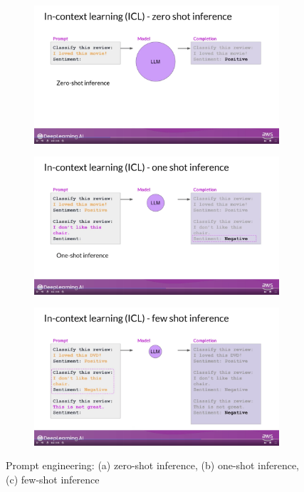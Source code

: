 \documentclass[12pt]{report}
\begin{document}
\begin{figure}
  \centering
  \begin{subfigure}[] %
    \centering
    \includegraphics[trim=3cm 7cm 5cm 0cm,clip,scale=0.1]{pics/zeroshot.png}
  \end{subfigure}%
  \begin{subfigure}[] %
    \centering
    \includegraphics[trim=3cm 7cm 5cm 0cm,clip,scale=0.1]{pics/oneshot.png}
  \end{subfigure}
  \begin{subfigure}[] %
  \centering
  \includegraphics[trim=3cm 7cm 5cm 0cm,clip,scale=0.1]{pics/fewshot.png}
  \end{subfigure}
  \caption{Prompt engineering: (a) zero-shot inference, (b) one-shot inference, (c) few-shot inference}
\end{figure}
\end{document}
